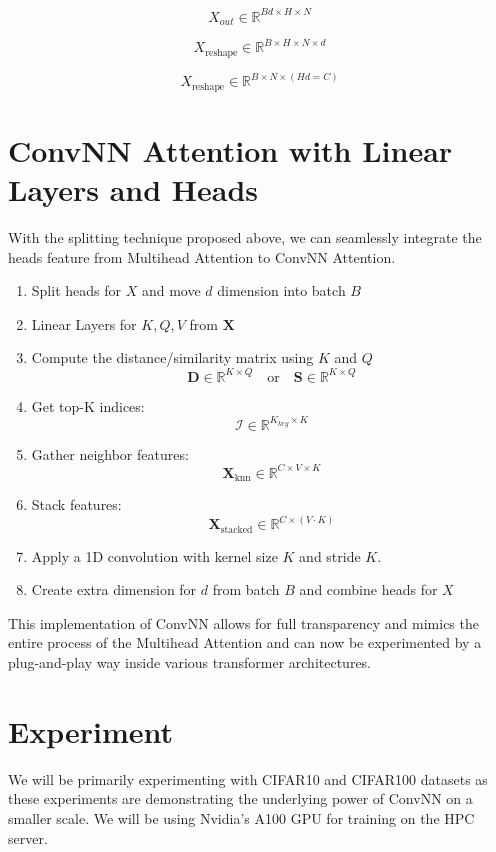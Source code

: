 \documentclass{article}
\begin{document}
\[
X_{out} \in \mathbb{R}^{Bd \times H \times N}
\]

\[
X_{\text{reshape}} \in \mathbb{R}^{B \times H \times N \times d}
\]

\[
X_{\text{reshape}} \in \mathbb{R}^{B \times N \times (Hd = C)}
\]

\section{ConvNN Attention with Linear Layers and Heads}
With the splitting technique proposed above, we can seamlessly integrate the heads feature from Multihead Attention to ConvNN Attention. 

\begin{enumerate}
    \item Split heads for \(X\) and move \(d\) dimension into batch \(B\)
    \item Linear Layers for \(K, Q, V\) from \(\mathbf{X}\)
    \item Compute the distance/similarity matrix using \(K\) and \(Q\)
    \[
        \mathbf{D} \in \mathbb{R}^{K \times Q} \quad \text{or} \quad \mathbf{S} \in \mathbb{R}^{K \times Q}
    \]
    \item Get top-K indices: 
    \[
        \mathcal{I} \in \mathbb{R}^{K_{key} \times K}
    \]
    \item Gather neighbor features: 
    \[
        \mathbf{X}_{\text{knn}} \in \mathbb{R}^{C \times V \times K}
    \]
    \item Stack features: 
    \[
        \mathbf{X}_{\text{stacked}} \in \mathbb{R}^{C \times (V \cdot K)}
    \]
    \item Apply a 1D convolution with kernel size \(K\) and stride \(K\).
    \item Create extra dimension for \(d\) from batch \(B\) and combine heads for \(X\)
\end{enumerate}

This implementation of ConvNN allows for full transparency and mimics the entire process of the Multihead Attention and can now be experimented by a plug-and-play way inside various transformer architectures. 

\section{Experiment}
We will be primarily experimenting with CIFAR10 and CIFAR100 datasets as these experiments are demonstrating the underlying power of ConvNN on a smaller scale. We will be using Nvidia's A100 GPU for training on the HPC server. 
\end{document}
